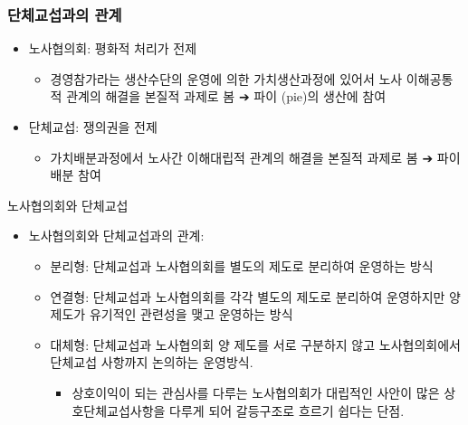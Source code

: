 \documentclass[aspectratio=169,xcolor=dvipsnames,handout]{beamer}
\begin{document}
\begin{frame}[allowframebreaks]
    \frametitle{단체교섭과의 관계}
    \begin{itemize}[<+->]
        \item 노사협의회: 평화적 처리가 전제
        \begin{itemize}[<+->]
            \item 경영참가라는 생산수단의 운영에 의한 가치생산과정에 있어서 노사 이해공통적 관계의 해결을 본질적 과제로 봄 ➔ 파이 (pie)의 생산에 참여
        \end{itemize}
        \item 단체교섭: 쟁의권을 전제
        \begin{itemize}[<+->]
            \item 가치배분과정에서 노사간 이해대립적 관계의 해결을 본질적 과제로 봄 ➔ 파이 배분 참여
        \end{itemize}
    \end{itemize}
    \framebreak\relax
    \begin{table}
        \centering
        \resizebox{.8\textwidth}{!}{\relax
            
        }
        \caption{노사협의회와 단체교섭}
    \end{table}
    \framebreak\relax
    \begin{itemize}[<+->]
        \item 노사협의회와 단체교섭과의 관계:
        \begin{itemize}[<+->]
            \item 분리형: 단체교섭과 노사협의회를 별도의 제도로 분리하여 운영하는 방식
            \item 연결형: 단체교섭과 노사협의회를 각각 별도의 제도로 분리하여 운영하지만 양 제도가 유기적인 관련성을 맺고 운영하는 방식
            \item 대체형: 단체교섭과 노사협의회 양 제도를 서로 구분하지 않고 노사협의회에서 단체교섭 사항까지 논의하는 운영방식. 
                \begin{itemize}[<+->]
                    \item 상호이익이 되는 관심사를 다루는 노사협의회가 대립적인 사안이 많은 상호단체교섭사항을 다루게 되어 갈등구조로 흐르기 쉽다는 단점.
                \end{itemize}
        \end{itemize}
    \end{itemize}
\end{frame}
\end{document}

